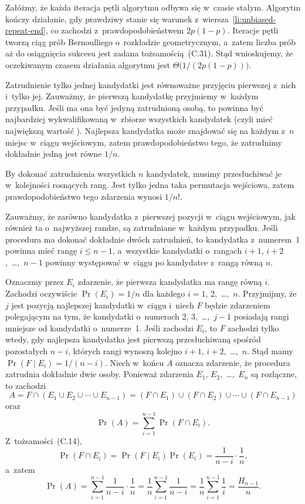 Załóżmy, że każda iteracja pętli algorytmu odbywa się w~czasie stałym. Algorytm kończy działanie, gdy prawdziwy stanie się warunek z~wiersza~\ref{li:unbiased-repeat-end}, co zachodzi z~prawdopodobieństwem $2p(1-p)$. Iteracje pętli tworzą ciąg prób Bernoulliego o~rozkładzie geometrycznym, a~zatem liczba prób aż do osiągnięcia sukcesu jest zadana tożsamością~(C.31). Stąd wnioskujemy, że oczekiwanym czasem działania algorytmu jest $\Theta\bigl(1/(2p(1-p))\bigr)$.


\exercise %
Zatrudnienie tylko jednej kandydatki jest równoważne przyjęciu pierwszej z~nich i~tylko jej. Zauważmy, że pierwszą kandydatkę przyjmiemy w~każdym przypadku. Jeśli ma ona być jedyną zatrudnioną osobą, to powinna być najbardziej wykwalifikowaną w~zbiorze wszystkich kandydatek (czyli mieć największą wartość ). Najlepsza kandydatka może znajdować się na każdym z~$n$ miejsc w~ciągu wejściowym, zatem prawdopodobieństwo tego, że zatrudnimy dokładnie jedną jest równe $1/n$.

By dokonać zatrudnienia wszystkich $n$ kandydatek, musimy przesłuchiwać je w~kolejności rosnących rang. Jest tylko jedna taka permutacja wejściowa, zatem prawdopodobieństwo tego zdarzenia wynosi $1/n!$.

\exercise %
Zauważmy, że zarówno kandydatka z~pierwszej pozycji w~ciągu wejściowym, jak również ta o~najwyższej randze, są zatrudniane w~każdym przypadku. Jeśli procedura  ma dokonać dokładnie dwóch zatrudnień, to kandydatka z~numerem~1 powinna mieć rangę $i\le n-1$, a~wszystkie kandydatki o~rangach $i+1$, $i+2$,~\dots,~$n-1$ powinny występować w~ciągu po kandydatce z~rangą równą $n$.

Oznaczmy przez $E_i$ zdarzenie, że pierwsza kandydatka ma rangę równą $i$. Zachodzi oczywiście $\Pr(E_i)=1/n$ dla każdego $i=1$, 2,~\dots,~$n$. Przyjmijmy, że $j$ jest pozycją najlepszej kandydatki w~ciągu i~niech $F$ będzie zdarzeniem polegającym na tym, że kandydatki o~numerach 2, 3,~\dots,~$j-1$ posiadają rangi mniejsze od kandydatki o~numerze~1. Jeśli zachodzi $E_i$, to $F$ zachodzi tylko wtedy, gdy najlepsza kandydatka jest pierwszą przesłuchiwaną spośród pozostałych $n-i$, których rangi wynoszą kolejno $i+1$, $i+2$,~\dots,~$n$. Stąd mamy $\Pr(F\mid E_i)=1/(n-i)$. Niech w~końcu $A$ oznacza zdarzenie, że procedura  zatrudnia dokładnie dwie osoby. Ponieważ zdarzenia $E_1$, $E_2$,~\dots,~$E_n$ są rozłączne, to zachodzi
\[
	A = F\cap(E_1\cup E_2\cup\cdots\cup E_{n-1}) = (F\cap E_1)\cup(F\cap E_2)\cup\cdots\cup(F\cap E_{n-1})
\]
oraz
\[
	\Pr(A) = \sum_{i=1}^{n-1}\Pr(F\cap E_i).
\]
Z~tożsamości~(C.14),
\[
	\Pr(F\cap E_i) = \Pr(F\mid E_i)\Pr(E_i) = \frac{1}{n-i}\cdot\frac{1}{n},
\]
a~zatem
\[
	\Pr(A) = \sum_{i=1}^{n-1}\frac{1}{n-i}\cdot\frac{1}{n} = \frac{1}{n}\sum_{i=1}^{n-1}\frac{1}{n-i} = \frac{1}{n}\sum_{i=1}^{n-1}\frac{1}{i} = \frac{H_{n-1}}{n}.
\]

